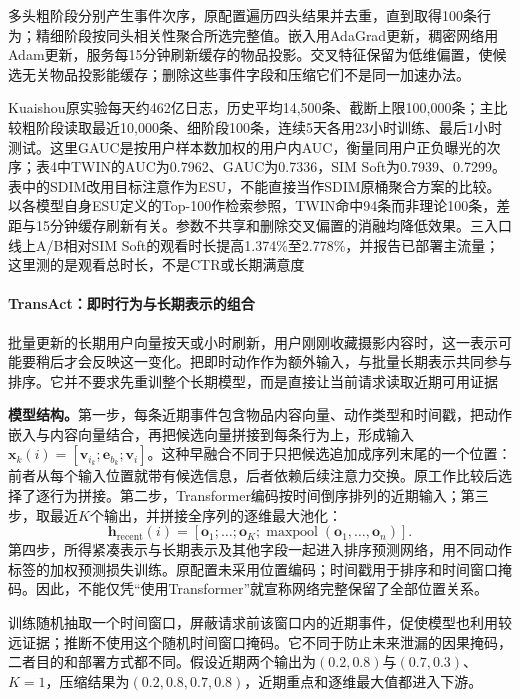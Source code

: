 多头粗阶段分别产生事件次序，原配置遍历四头结果并去重，直到取得100条行为；精细阶段按同头相关性聚合所选完整值。嵌入用AdaGrad更新，稠密网络用Adam更新，服务每15分钟刷新缓存的物品投影。交叉特征保留为低维偏置，使候选无关物品投影能缓存；删除这些事件字段和压缩它们不是同一加速办法。

Kuaishou原实验每天约462亿日志，历史平均14,500条、截断上限100,000条；主比较粗阶段读取最近10,000条、细阶段100条，连续5天各用23小时训练、最后1小时测试。这里GAUC是按用户样本数加权的用户内AUC，衡量同用户正负曝光的次序；表4中TWIN的AUC为0.7962、GAUC为0.7336，SIM Soft为0.7939、0.7299。表中的SDIM改用目标注意作为ESU，不能直接当作SDIM原桶聚合方案的比较。以各模型自身ESU定义的Top-100作检索参照，TWIN命中94条而非理论100条，差距与15分钟缓存刷新有关。参数不共享和删除交叉偏置的消融均降低效果。三入口线上A/B相对SIM Soft的观看时长提高1.374\%至2.778\%，并报告已部署主流量；这里测的是观看总时长，不是CTR或长期满意度

\paragraph{TransAct：即时行为与长期表示的组合}
\label{sec:rs-transact}

批量更新的长期用户向量按天或小时刷新，用户刚刚收藏摄影内容时，这一表示可能要稍后才会反映这一变化。把即时动作作为额外输入，与批量长期表示共同参与排序。它并不要求先重训整个长期模型，而是直接让当前请求读取近期可用证据

\textbf{模型结构。}第一步，每条近期事件包含物品内容向量、动作类型和时间戳，把动作嵌入与内容向量结合，再把候选向量拼接到每条行为上，形成输入$\bm{x}_k(i)=[\bm{v}_{i_k};\bm{e}_{b_k};\bm{v}_i]$。这种早融合不同于只把候选追加成序列末尾的一个位置：前者从每个输入位置就带有候选信息，后者依赖后续注意力交换。原工作比较后选择了逐行为拼接。第二步，Transformer编码按时间倒序排列的近期输入；第三步，取最近$K$个输出，并拼接全序列的逐维最大池化：
\begin{equation}
  \bm{h}_{\mathrm{recent}}(i)=
    [\bm{o}_1;\ldots;\bm{o}_K;
      \operatorname{maxpool}(\bm{o}_1,\ldots,\bm{o}_n)].
  \label{eq:rs-transact-compress}
\end{equation}
第四步，所得紧凑表示与长期表示及其他字段一起进入排序预测网络，用不同动作标签的加权预测损失训练。原配置未采用位置编码；时间戳用于排序和时间窗口掩码。因此，不能仅凭“使用Transformer”就宣称网络完整保留了全部位置关系。

训练随机抽取一个时间窗口，屏蔽请求前该窗口内的近期事件，促使模型也利用较远证据；推断不使用这个随机时间窗口掩码。它不同于防止未来泄漏的因果掩码，二者目的和部署方式都不同。假设近期两个输出为$(0.2,0.8)$与$(0.7,0.3)$、$K=1$，压缩结果为$(0.2,0.8,0.7,0.8)$，近期重点和逐维最大值都进入下游。

